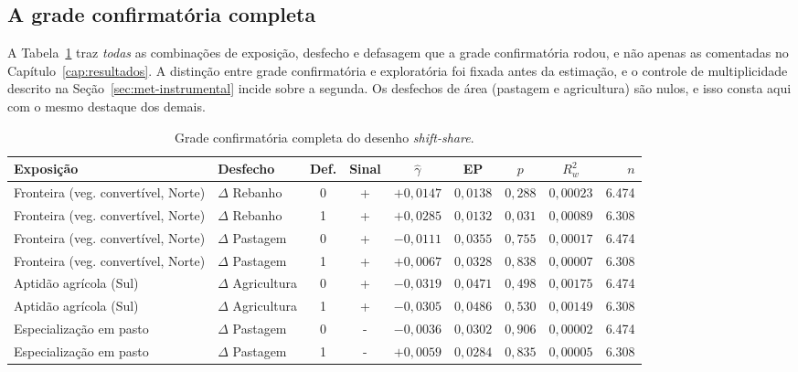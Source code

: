 \FloatBarrier

\subsection{A grade confirmatória completa}

A Tabela~\ref{tab:confirmatorio} traz \emph{todas} as combinações de exposição,
desfecho e defasagem que a grade confirmatória rodou, e não apenas as
comentadas no Capítulo~\ref{cap:resultados}. A distinção entre grade
confirmatória e exploratória foi fixada antes da estimação, e o controle de
multiplicidade descrito na Seção~\ref{sec:met-instrumental} incide sobre a
segunda. Os desfechos de área (pastagem e agricultura) são nulos, e isso
consta aqui com o mesmo destaque dos demais.


\begin{table}[!ht]
\centering
\caption[Grade confirmatória do \emph{drive} comum]{Grade confirmatória completa do desenho \emph{shift-share}.}
\label{tab:confirmatorio}
\small
\begin{tabular}{p{3.0cm}p{1.8cm}ccccccr}
\toprule
\textbf{Exposição} & \textbf{Desfecho} & \textbf{Def.} & \textbf{Sinal} & \textbf{$\hat{\gamma}$} & \textbf{EP} & \textbf{$p$} & \textbf{$R^2_w$} & \textbf{$n$} \\
\midrule
Fronteira (veg. convertível, Norte) & $\Delta$ Rebanho & 0 & + & $+0{,}0147$ & $0{,}0138$ & $0{,}288$ & $0{,}00023$ & 6.474 \\
Fronteira (veg. convertível, Norte) & $\Delta$ Rebanho & 1 & + & $+0{,}0285$ & $0{,}0132$ & $0{,}031$ & $0{,}00089$ & 6.308 \\
Fronteira (veg. convertível, Norte) & $\Delta$ Pastagem & 0 & + & $-0{,}0111$ & $0{,}0355$ & $0{,}755$ & $0{,}00017$ & 6.474 \\
Fronteira (veg. convertível, Norte) & $\Delta$ Pastagem & 1 & + & $+0{,}0067$ & $0{,}0328$ & $0{,}838$ & $0{,}00007$ & 6.308 \\
Aptidão agrícola (Sul) & $\Delta$ Agricultura & 0 & + & $-0{,}0319$ & $0{,}0471$ & $0{,}498$ & $0{,}00175$ & 6.474 \\
Aptidão agrícola (Sul) & $\Delta$ Agricultura & 1 & + & $-0{,}0305$ & $0{,}0486$ & $0{,}530$ & $0{,}00149$ & 6.308 \\
Especialização em pasto & $\Delta$ Pastagem & 0 & - & $-0{,}0036$ & $0{,}0302$ & $0{,}906$ & $0{,}00002$ & 6.474 \\
Especialização em pasto & $\Delta$ Pastagem & 1 & - & $+0{,}0059$ & $0{,}0284$ & $0{,}835$ & $0{,}00005$ & 6.308 \\

\end{tabular}
\end{table}
